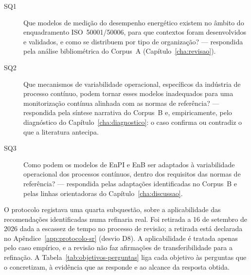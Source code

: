 \begin{description}
  \item[SQ1] Que modelos de medição do desempenho energético existem no
    âmbito do enquadramento ISO~50001/50006, para que contextos foram
    desenvolvidos e validados, e como se distribuem por tipo de
    organização? --- respondida pela análise bibliométrica do Corpus~A
    (Capítulo~\ref{cha:revisao}).
  \item[SQ2] Que mecanismos de variabilidade operacional, específicos da
    indústria de processo contínuo, podem tornar esses modelos
    inadequados para uma monitorização contínua alinhada com as normas
    de referência? --- respondida pela síntese narrativa do Corpus~B e,
    empiricamente, pelo diagnóstico do Capítulo~\ref{cha:diagnostico}: o
    caso confirma ou contradiz o que a literatura antecipa.
  \item[SQ3] Como podem os modelos de EnPI e EnB ser adaptados à
    variabilidade operacional dos processos contínuos, dentro dos
    requisitos das normas de referência? --- respondida pelas
    adaptações identificadas no Corpus~B e pelas linhas orientadoras do
    Capítulo~\ref{cha:discussao}.
\end{description}

O protocolo registava uma quarta subquestão, sobre a aplicabilidade das
recomendações identificadas numa refinaria real. Foi retirada a 16 de
setembro de 2026 dada a escassez de tempo no processo de revisão; a retirada está declarada no
Apêndice~\ref{app:protocolo-sr} (desvio D8). A aplicabilidade é tratada
apenas pelo caso empírico, e a revisão não faz afirmações de
transferibilidade para a refinação. A Tabela~\ref{tab:objetivos-perguntas}
liga cada objetivo às perguntas que o concretizam, à evidência que as
responde e ao alcance da resposta obtida.

